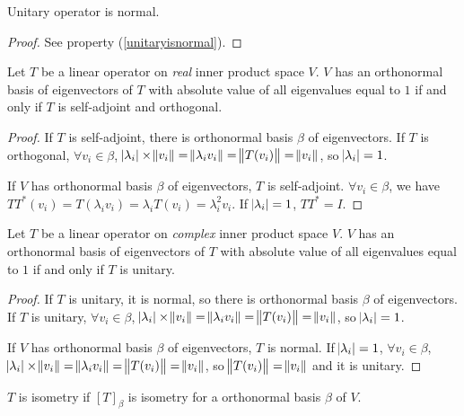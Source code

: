 \begin{theorem}
    Unitary operator is normal.    
\end{theorem}
\begin{proof}
    See  property (\ref{unitaryisnormal}).
\end{proof}



\begin{theorem}
    Let $T$ be a linear operator on \emph{real} inner product space $V$. $V$ has an orthonormal basis of eigenvectors of $T$ with absolute value of all eigenvalues equal to $1$ if and only if $T$ is self-adjoint and orthogonal.    
\end{theorem}
\begin{proof}
    If $T$ is self-adjoint, there is orthonormal basis $\beta$ of eigenvectors. If $T$ is orthogonal, $\forall v_i \in \beta$, $\abs{\lambda_i} \times \norm{v_i} = \norm{\lambda_i v_i} = \norm{T(v_i)} = \norm{v_i}$, so $\abs{\lambda_i} = 1$.
    
    If $V$ has orthonormal basis $\beta$ of eigenvectors, $T$ is self-adjoint. $\forall v_i \in \beta$, we have $TT^* (v_i) = T(\lambda_i v_i ) = \lambda_i T(v_i) = \lambda_i^2 v_i$. If $\abs{\lambda_i} = 1$, $TT^* = I$.
\end{proof}

\begin{theorem}
    Let $T$ be a linear operator on \emph{complex} inner product space $V$. $V$ has an orthonormal basis of eigenvectors of $T$ with absolute value of all eigenvalues equal to  $1$ if and only if $T$ is unitary.
\end{theorem}
\begin{proof}
    If $T$ is unitary, it is normal, so there is orthonormal basis $\beta$ of eigenvectors. If $T$ is unitary, $\forall v_i \in \beta$, $\abs{\lambda_i} \times \norm{v_i} = \norm{\lambda_i v_i} = \norm{T(v_i)} = \norm{v_i}$, so $\abs{\lambda_i} = 1$.
    
    If $V$ has orthonormal basis $\beta$ of eigenvectors, $T$ is normal. If $\abs{\lambda_i} = 1$, $\forall v_i \in \beta$, $\abs{\lambda_i} \times \norm{v_i} = \norm{\lambda_i v_i} = \norm{T(v_i)} = \norm{v_i}$, so $\norm{T(v_i)} = \norm{v_i}$ and it is unitary.
\end{proof}

\begin{theorem}
    $T$ is isometry if $[T]_\beta$ is isometry for a orthonormal basis $\beta$ of $V$.
\end{theorem}

